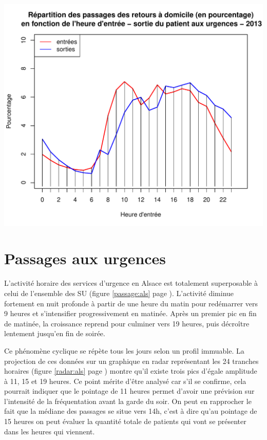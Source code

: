 \documentclass[12pt,english,french,twoside]{book}\usepackage[]{graphicx}\usepackage[]{color}
\makeatletter
\def\maxwidth{ %
  \ifdim\Gin@nat@width>\linewidth
    \linewidth
  \else
    \Gin@nat@width
  \fi
}
\newenvironment{knitrout}{}{} %
\makeatother
\begin{document}
\begin{center}

\begin{knitrout}
\color{fgcolor}
\includegraphics[width=\maxwidth]{figure/es_dom} 

\end{knitrout}

\label{fig:es_dom}%
\end{center}


\section{Passages aux urgences}


L'activité horaire des services d'urgence en Alsace est totalement superposable à celui de l'ensemble des SU (figure \ref{passage:als} page \pageref{passage:als}). L'activité diminue fortement en nuit profonde à partir de une heure du matin pour redémarrer vers 9 heures et s'intensifier progressivement en matinée. Après un premier pic en fin de matinée, la croissance reprend pour culminer vers 19 heures, puis décroître lentement jusqu'en fin de soirée.

Ce phénomène cyclique se répète tous les jours selon un profil immuable. La projection de ces données sur un graphique en radar représentant les 24 tranches horaires (figure \ref{radar:als} page \pageref{radar:als}) montre qu'il existe trois pics d'égale amplitude à 11, 15 et 19 heures. Ce point mérite d'être analysé car s'il se confirme, cela pourrait indiquer que le pointage de 11 heures permet d'avoir une prévision sur l'intensité de la fréquentation avant la garde du soir. On peut en rapprocher le fait que la médiane des passages se situe vers 14h, c'est à dire qu'au pointage de 15 heures on peut évaluer la quantité totale de patients qui vont se présenter dans les heures qui viennent.
\end{document}
